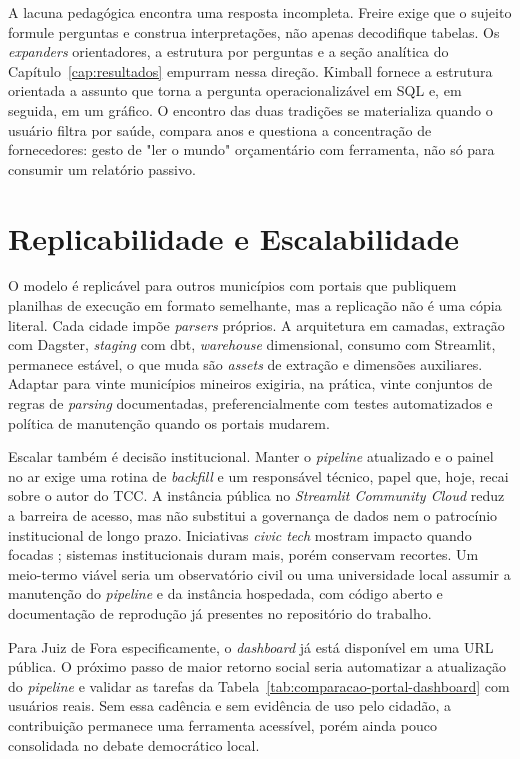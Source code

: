 A lacuna pedagógica encontra uma resposta incompleta. Freire \cite{freire1967liberdade} exige que o sujeito formule perguntas e construa interpretações, não apenas decodifique tabelas. Os \textit{expanders} orientadores, a estrutura por perguntas e a seção analítica do Capítulo~\ref{cap:resultados} empurram nessa direção. Kimball \cite{kimball2013data} fornece a estrutura orientada a assunto que torna a pergunta operacionalizável em SQL e, em seguida, em um gráfico. O encontro das duas tradições se materializa quando o usuário filtra por saúde, compara anos e questiona a concentração de fornecedores: gesto de "ler o mundo" orçamentário com ferramenta, não só para consumir um relatório passivo.

\section{Replicabilidade e Escalabilidade}

O modelo é replicável para outros municípios com portais que publiquem planilhas de execução em formato semelhante, mas a replicação não é uma cópia literal. Cada cidade impõe \textit{parsers} próprios. A arquitetura em camadas, extração com Dagster, \textit{staging} com dbt, \textit{warehouse} dimensional, consumo com Streamlit, permanece estável, o que muda são \textit{assets} de extração e dimensões auxiliares. Adaptar para vinte municípios mineiros exigiria, na prática, vinte conjuntos de regras de \textit{parsing} documentadas, preferencialmente com testes automatizados e política de manutenção quando os portais mudarem.

Escalar também é decisão institucional. Manter o \textit{pipeline} atualizado e o painel no ar exige uma rotina de \textit{backfill} e um responsável técnico, papel que, hoje, recai sobre o autor do TCC. A instância pública no \textit{Streamlit Community Cloud} reduz a barreira de acesso, mas não substitui a governança de dados nem o patrocínio institucional de longo prazo. Iniciativas \textit{civic tech} mostram impacto quando focadas \cite{marco2022transparencia}; sistemas institucionais duram mais, porém conservam recortes. Um meio-termo viável seria um observatório civil ou uma universidade local assumir a manutenção do \textit{pipeline} e da instância hospedada, com código aberto e documentação de reprodução já presentes no repositório do trabalho.

Para Juiz de Fora especificamente, o \textit{dashboard} já está disponível em uma URL pública. O próximo passo de maior retorno social seria automatizar a atualização do \textit{pipeline} e validar as tarefas da Tabela~\ref{tab:comparacao-portal-dashboard} com usuários reais. Sem essa cadência e sem evidência de uso pelo cidadão, a contribuição permanece uma ferramenta acessível, porém ainda pouco consolidada no debate democrático local.
